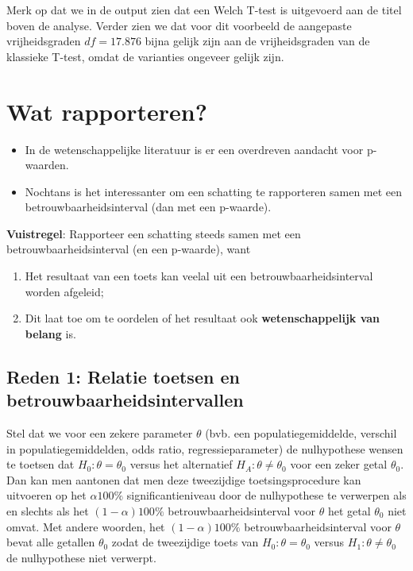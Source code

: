\documentclass[
  12pt,dutch]{book}
\providecommand{\tightlist}{%
  \setlength{\itemsep}{0pt}\setlength{\parskip}{0pt}}
\theoremstyle{definition}
\theoremstyle{definition}
\theoremstyle{definition}
\theoremstyle{definition}
\theoremstyle{remark}
\begin{document}
Merk op dat we in de output zien dat een Welch T-test is uitgevoerd aan de titel boven de analyse.
Verder zien we dat voor dit voorbeeld de aangepaste vrijheidsgraden \(df = 17.876\) bijna gelijk zijn aan de vrijheidsgraden van de klassieke T-test, omdat de varianties ongeveer gelijk zijn.

\section{Wat rapporteren?}\label{wat-rapporteren-1}

\begin{itemize}
\tightlist
\item
  In de wetenschappelijke literatuur is er een overdreven aandacht voor p-waarden.
\item
  Nochtans is het interessanter om een schatting te rapporteren samen met een betrouwbaarheidsinterval (dan met een p-waarde).
\end{itemize}

\textbf{Vuistregel}:
Rapporteer een schatting steeds samen met een betrouwbaarheidsinterval (en een p-waarde), want

\begin{enumerate}
\def\labelenumi{\arabic{enumi}.}
\tightlist
\item
  Het resultaat van een toets kan veelal uit een betrouwbaarheidsinterval worden afgeleid;
\item
  Dit laat toe om te oordelen of het resultaat ook \textbf{wetenschappelijk van belang} is.
\end{enumerate}

\subsection{Reden 1: Relatie toetsen en betrouwbaarheidsintervallen}\label{reden-1-relatie-toetsen-en-betrouwbaarheidsintervallen}

Stel dat we voor een zekere parameter \(\theta\) (bvb. een
populatiegemiddelde, verschil in populatiegemiddelden, odds ratio,
regressieparameter) de nulhypothese wensen te toetsen dat \(H_0 : \theta=
\theta_0\) versus het alternatief \(H_A : \theta \neq \theta_0\) voor een zeker
getal \(\theta_0\). Dan kan men aantonen dat men deze tweezijdige
toetsingsprocedure kan uitvoeren op het \(\alpha 100\%\) significantieniveau
door de nulhypothese te verwerpen als en slechts als het \((1-\alpha)100\%\)
betrouwbaarheidsinterval voor \(\theta\) het getal \(\theta_0\) niet omvat. Met
andere woorden, het \((1-\alpha)100\%\) betrouwbaarheidsinterval voor \(\theta\)
bevat alle getallen \(\theta_0\) zodat de tweezijdige toets van \(H_0 : \theta=
\theta_0\) versus \(H_1 : \theta \neq \theta_0\) de nulhypothese niet verwerpt.
\end{document}
